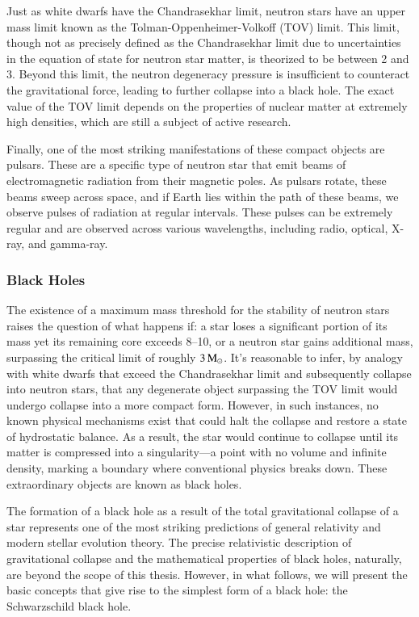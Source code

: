 \documentclass[main.tex]{subfiles}
\begin{document}
    Just as white dwarfs have the Chandrasekhar limit, neutron stars have an upper mass limit known as the Tolman-Oppenheimer-Volkoff (TOV) limit. This limit, though not as precisely defined as the Chandrasekhar limit due to uncertainties in the equation of state for neutron star matter, is theorized to be between 2 and 3\msun. Beyond this limit, the neutron degeneracy pressure is insufficient to counteract the gravitational force, leading to further collapse into a black hole. The exact value of the TOV limit depends on the properties of nuclear matter at extremely high densities, which are still a subject of active research.

    Finally, one of the most striking manifestations of these compact objects are pulsars. These are a specific type of neutron star that emit beams of electromagnetic radiation from their magnetic poles. As pulsars rotate, these beams sweep across space, and if Earth lies within the path of these beams, we observe pulses of radiation at regular intervals. These pulses can be extremely regular and are observed across various wavelengths, including radio, optical, X-ray, and gamma-ray.

    \subsubsection{Black Holes}
    \resetinlineenum
    The existence of a maximum mass threshold for the stability of neutron stars raises the question of what happens if: \inlineitem a star loses a significant portion of its mass yet its remaining core exceeds \numrange{8}{10}\msun, or \inlineitem a neutron star gains additional mass, surpassing the critical limit of roughly $3\mathrm{\,M_\odot}$.  It's reasonable to infer, by analogy with white dwarfs that exceed the Chandrasekhar limit and subsequently collapse into neutron stars, that any degenerate object surpassing the TOV limit would undergo collapse into a more compact form. However, in such instances, no known physical mechanisms exist that could halt the collapse and restore a state of hydrostatic balance. As a result, the star would continue to collapse until its matter is compressed into a singularity---a point with no volume and infinite density, marking a boundary where conventional physics breaks down. These extraordinary objects are known as black holes.

    The formation of a black hole as a result of the total gravitational collapse of a star represents one of the most striking predictions of general relativity and modern stellar evolution theory. The precise relativistic description of gravitational collapse and the mathematical properties of black holes, naturally, are beyond the scope of this thesis. However, in what follows, we will present the basic concepts that give rise to the simplest form of a black hole: the Schwarzschild black hole.
\end{document}
